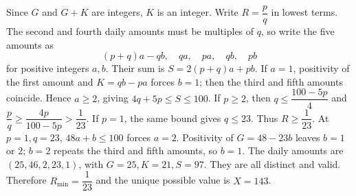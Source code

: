 Since $G$ and $G+K$ are integers, $K$ is an integer. Write $R=\dfrac{p}{q}$ in lowest terms. The second and fourth daily amounts must be multiples of $q$, so write the five amounts as
\[(p+q)a-qb,\quad qa,\quad pa,\quad qb,\quad pb\]
for positive integers $a,b$. Their sum is $S=2(p+q)a+pb$. If $a=1$, positivity of the first amount and $K=qb-pa$ forces $b=1$; then the third and fifth amounts coincide. Hence $a\ge2$, giving $4q+5p\le S\le100$.
If $p\ge2$, then $q\le\dfrac{100-5p}{4}$ and $\dfrac{p}{q}\ge\dfrac{4p}{100-5p}>\dfrac{1}{23}$. If $p=1$, the same bound gives $q\le23$. Thus $R\ge\dfrac{1}{23}$.
At $p=1,q=23$, $48a+b\le100$ forces $a=2$. Positivity of $G=48-23b$ leaves $b=1$ or $2$; $b=2$ repeats the third and fifth amounts, so $b=1$. The daily amounts are $(25,46,2,23,1)$, with $G=25,K=21,S=97$. They are all distinct and valid. Therefore $\boxed{R_{\min}=\dfrac{1}{23}}$ and the unique possible value is $\boxed{X=143}$.
